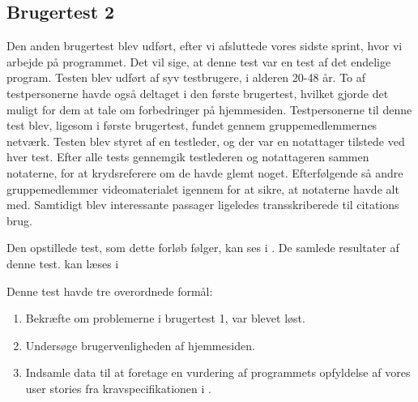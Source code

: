 \subsection{Brugertest 2}
Den anden brugertest blev udført, efter vi afsluttede vores sidste sprint, hvor vi arbejde på programmet.
Det vil sige, at denne test var en test af det endelige program.
Testen blev udført af syv testbrugere, i alderen 20-48 år.
To af testpersonerne havde også deltaget i den første brugertest, hvilket gjorde det muligt for dem at tale om forbedringer på hjemmesiden.
Testpersonerne til denne test blev, ligesom i første brugertest, fundet gennem gruppemedlemmernes netværk.
Testen blev styret af en testleder, og der var en notattager tilstede ved hver test.
Efter alle tests gennemgik testlederen og notattageren sammen notaterne, for at krydsreferere om de havde glemt noget.
Efterfølgende så andre gruppemedlemmer videomaterialet igennem for at sikre, at notaterne havde alt med.
Samtidigt blev interessante passager ligeledes transskriberede til citations brug.

Den opstillede test, som dette forløb følger, kan ses i .
De samlede resultater af denne test. kan læses i  

Denne test havde tre overordnede formål:
\begin{enumerate}
   \item Bekræfte om problemerne i brugertest 1, var blevet løst. 
   \item Undersøge brugervenligheden af hjemmesiden.
   \item Indsamle data til at foretage en vurdering af programmets opfyldelse af vores user stories fra kravspecifikationen i . 
\end{enumerate}

